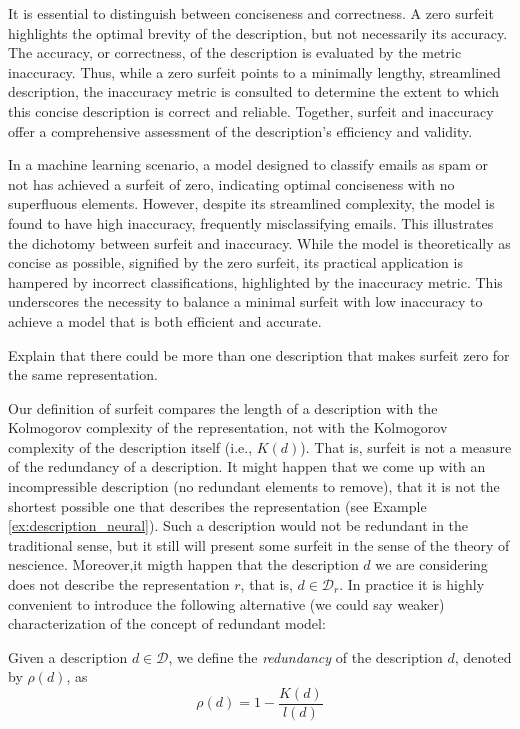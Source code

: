 It is essential to distinguish between conciseness and correctness. A zero surfeit highlights the optimal brevity of the description, but not necessarily its accuracy. The accuracy, or correctness, of the description is evaluated by the metric inaccuracy. Thus, while a zero surfeit points to a minimally lengthy, streamlined description, the inaccuracy metric is consulted to determine the extent to which this concise description is correct and reliable. Together, surfeit and inaccuracy offer a comprehensive assessment of the description's efficiency and validity.

\begin{example}
In a machine learning scenario, a model designed to classify emails as spam or not has achieved a surfeit of zero, indicating optimal conciseness with no superfluous elements. However, despite its streamlined complexity, the model is found to have high inaccuracy, frequently misclassifying emails. This illustrates the dichotomy between surfeit and inaccuracy. While the model is theoretically as concise as possible, signified by the zero surfeit, its practical application is hampered by incorrect classifications, highlighted by the inaccuracy metric. This underscores the necessity to balance a minimal surfeit with low inaccuracy to achieve a model that is both efficient and accurate.
\end{example}

{\color{red} Explain  that there could be more than one description that makes surfeit zero for the same representation.}

Our definition of surfeit compares the length of a description with the Kolmogorov complexity of the representation, not with the Kolmogorov complexity of the description itself (i.e., $K\left( d \right)$). That is, surfeit is not a measure of the redundancy of a description. It might happen that we come up with an incompressible description (no redundant elements to remove), that it is not the shortest possible one that describes the representation (see Example \ref{ex:description_neural}). Such a description would not be redundant in the traditional sense, but it still will present some surfeit in the sense of the theory of nescience. Moreover,it migth happen that the description $d$ we are considering does not describe the representation $r$, that is, $d \in \mathcal{D}_r$. In practice it is highly convenient to introduce the following alternative (we could say weaker) characterization of the concept of redundant model:

\begin{definition}[Redundancy]
Given a description $d \in \mathcal{D}$, we define the \emph{redundancy} of the description $d$, denoted by $\rho(d)$, as
\[
\rho(d) = 1 - \frac{K(d)}{l(d)}
\]
\end{definition}

